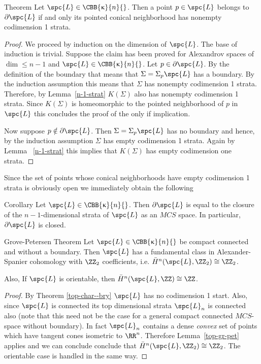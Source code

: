 \begin{thm}{Theorem}\label{top-char--bry}
Let $\spc{L}\in \CBB{\kappa}{n}{}$. Then a point $p\in \spc{L}$ belongs to $\partial \spc{L}$ if and only its pointed conical neighborhood has nonempty codimension 1 strata.
\end{thm}
\begin{proof}
We proceed by induction on the dimension of $\spc{L}$. The base of induction is trivial.
Suppose the claim has been proved for Alexandrov spaces of $\dim\le n-1$ and $\spc{L}\in \CBB{\kappa}{n}{}$. Let $p\in \partial \spc{L}$. By the definition of the boundary that means that $\Sigma=\Sigma_p\spc{L}$ has a boundary. By the induction assumption this means that $\Sigma$ has nonempty codimension 1 strata. Therefore, by Lemma~\ref{n-1-strat} $K(\Sigma)$ also has nonempty codimension 1 strata. Since $K(\Sigma)$ is homeomorphic to the pointed neighborhood of $p$ in $\spc{L}$ this concludes the proof of the only if implication.

Now suppose $p\notin \partial \spc{L}$. Then $\Sigma=\Sigma_p\spc{L}$ has no boundary and hence, by the induction assumption $\Sigma$ has empty codimension 1 strata. Again by Lemma ~\ref{n-1-strat} this implies that $K(\Sigma)$ has empty codimension one strata.
\end{proof}
Since  the set of points whose conical neighborhoods have empty codimension 1 strata is obviously open we immediately obtain the following
\begin{thm}{Corollary}\label{top=geom-bry}
Let $\spc{L}\in \CBB{\kappa}{n}{}$. Then $\partial \spc{L}$ is equal to the closure of the $n-1$-dimensional strata of $\spc{L}$ as an $MCS$ space. In particular,
$\partial \spc{L}$ is closed.
\end{thm}

\begin{thm}{Grove-Petersen Theorem}\label{grove-pet}
Let  $\spc{L}\in \CBB{\kappa}{n}{}$ be compact connected and without a boundary. 
Then $\spc{L}$ has a fundamental class in Alexander-Spanier cohomology with $\ZZ_2$ coefficients, i.e. $\bar H^{n}(\spc{L},\ZZ_2)\cong \ZZ_2$. 

Also, If $\spc{L}$ is orientable, then   $\bar H^{n}(\spc{L},\ZZ)\cong \ZZ$. 


\end{thm}
\begin{proof}
By Theorem \ref{top-char--bry} $\spc{L}$ has no codimension 1 start. Also, since $\spc{L}$ is connected its top dimensional strata $\spc{L}_n$ is connected also (note that this need not be the case for a general  compact connected $MCS$-space without boundary). In fact $\spc{L}_n$ contains a dense {\it convex} set of points which have tangent cones isometric to $\RR^n$.
Therefore Lemma~\ref{top-gr-pet} applies and  we can conclude  conclude that  $\bar H^{n}(\spc{L},\ZZ_2)\cong \ZZ_2$.
The orientable case is handled in the same way.
\end{proof}

